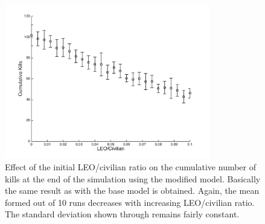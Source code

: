 \documentclass[11pt]{article}
\begin{document}
\begin{figure}[!htbp]
	\centering
		\includegraphics[width=0.80\textwidth]{../../code/modified_model/cum_kills_vs_LEO_civ.png}
	\caption{Effect of the initial LEO/civilian ratio on the cumulative number of kills at the end of the simulation using the modified model. Basically the same result as with the base model is obtained. Again, the mean formed out of 10 runs decreases with increasing LEO/civilian ratio. The standard deviation shown through remains fairly constant.}
	\label{fig:LEO_civ_modified}
\end{figure}
\end{document}
